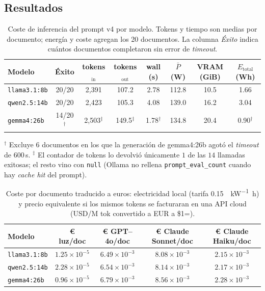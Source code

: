 \subsection{Resultados}

\begin{table}[h]
\centering\small
\caption{Coste de inferencia del prompt v4 por modelo. Tokens y tiempo
son medias por documento; energía y coste agregan los 20 documentos.
La columna \emph{Éxito} indica cuántos documentos completaron sin error
de \emph{timeout}.}
\label{tab:estudio-economico-modelos}
\begin{tabular}{lccccccc}
\toprule
Modelo & Éxito & tokens$_\text{in}$ & tokens$_\text{out}$ & wall (s) & $\bar{P}$ (W) & VRAM (GiB) & $E_\text{total}$ (Wh) \\
\midrule
\texttt{llama3.1:8b} & 20/20 & 2{,}391 & 107.2 & 2.78 & 112.8 & 10.5 & 1.66 \\
\texttt{qwen2.5:14b} & 20/20 & 2{,}423 & 105.3 & 4.08 & 139.0 & 16.2 & 3.04 \\
\texttt{gemma4:26b}  & 14/20$^\dagger$ & 2{,}503$^\ddagger$ & 149.5$^\ddagger$ & 1.78$^\dagger$ & 134.8 & 20.4 & 0.90$^\dagger$ \\
\bottomrule
\end{tabular}
\par\vspace{2pt}
\footnotesize
$^\dagger$ Excluye 6 documentos en los que la generación de gemma4:26b
agotó el \emph{timeout} de 600\,s.\quad
$^\ddagger$ El contador de tokens lo devolvió únicamente $1$ de las $14$
llamadas exitosas; el resto vino con \texttt{null} (Ollama no rellena
\texttt{prompt\_eval\_count} cuando hay \emph{cache hit} del prompt).
\end{table}

\begin{table}[h]
\centering\small
\caption{Coste por documento traducido a euros: electricidad local
(tarifa \SI{0.15}{\eur\per\kilo\watt\hour}) y precio equivalente si los
mismos tokens se facturaran en una API cloud (USD/M tok convertido a
EUR a \$1=).}
\label{tab:estudio-economico-coste}
\begin{tabular}{lcccc}
\toprule
Modelo & € luz/doc & € GPT--4o/doc & € Claude Sonnet/doc & € Claude Haiku/doc \\
\midrule
\texttt{llama3.1:8b} & $1.25\!\times\!10^{-5}$ & $6.49\!\times\!10^{-3}$ & $8.08\!\times\!10^{-3}$ & $2.15\!\times\!10^{-3}$ \\
\texttt{qwen2.5:14b} & $2.28\!\times\!10^{-5}$ & $6.54\!\times\!10^{-3}$ & $8.14\!\times\!10^{-3}$ & $2.17\!\times\!10^{-3}$ \\
\texttt{gemma4:26b}  & $0.96\!\times\!10^{-5}$ & $6.79\!\times\!10^{-3}$ & $8.56\!\times\!10^{-3}$ & $2.28\!\times\!10^{-3}$ \\
\bottomrule
\end{tabular}
\end{table}


